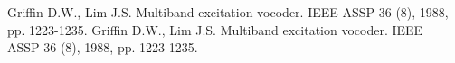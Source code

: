 \documentclass[a4paper,article,14pt]{extarticle}
\begin{document}
\begin{thebibliography}{1}
 Griffin D.W., Lim J.S. \flqq Multiband excitation vocoder\frqq. IEEE ASSP-36 (8), 1988, pp. 1223-1235.
 Griffin D.W., Lim J.S. \flqq Multiband excitation vocoder\frqq. IEEE ASSP-36 (8), 1988, pp. 1223-1235.
\end{thebibliography}
\end{document}
